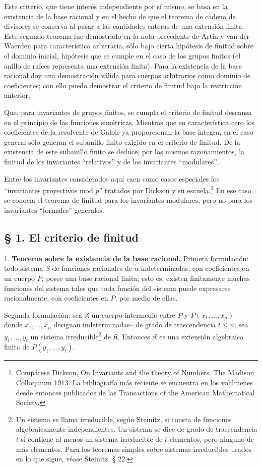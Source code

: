 \documentclass[11pt]{article}
\begin{document}
Este criterio, que tiene interés independiente por sí mismo, se basa en la existencia de la base racional y en el hecho de que el teorema de cadena de divisores se conserva al pasar a las cantidades enteras de una extensión finita. Este segundo teorema fue demostrado en la nota precedente de Artin y van der Waerden para característica arbitraria, sólo bajo cierta hipótesis de finitud sobre el dominio inicial, hipótesis que se cumple en el caso de los grupos finitos (el anillo de raíces representa una extensión finita). Para la existencia de la base racional doy una demostración válida para cuerpos arbitrarios como dominio de coeficientes; con ello puedo demostrar el criterio de finitud bajo la restricción anterior.

Que, para invariantes de grupos finitos, se cumpla el criterio de finitud descansa en el principio de las funciones simétricas. Mientras que en característica cero los coeficientes de la resolvente de Galois ya proporcionan la base íntegra, en el caso general sólo generan el subanillo finito exigido en el criterio de finitud. De la existencia de este subanillo finito se deduce, por los mismos razonamientos, la finitud de los invariantes ``relativos'' y de los invariantes ``modulares''.

Entre los invariantes considerados aquí caen como casos especiales los ``invariantes proyectivos mod $p$'' tratados por Dickson y su escuela.\footnote{Compárese Dickson, On Invariants and the theory of Numbers. The Madison Colloquium 1913. La bibliografía más reciente se encuentra en los volúmenes desde entonces publicados de las Transactions of the American Mathematical Society.} En ese caso se conocía el teorema de finitud para los invariantes modulares, pero no para los invariantes ``formales'' generales.

\subsection*{§ 1. El criterio de finitud}

1. \textbf{Teorema sobre la existencia de la base racional.} Primera formulación: todo sistema $S$ de funciones racionales de $n$ indeterminadas, con coeficientes en un cuerpo $P$, posee una base racional finita; esto es, existen finitamente muchas funciones del sistema tales que toda función del sistema puede expresarse racionalmente, con coeficientes en $P$, por medio de ellas.

Segunda formulación: sea $\mathfrak K$ un cuerpo intermedio entre $P$ y $P(x_1,\ldots,x_n)$ --donde $x_1,\ldots,x_n$ designan indeterminadas-- de grado de trascendencia $t\leq n$; sea $y_1,\ldots,y_t$ un sistema irreducible\footnote{Un sistema se llama irreducible, según Steinitz, si consta de funciones algebraicamente independientes. Un sistema se dice de grado de trascendencia $t$ si contiene al menos un sistema irreducible de $t$ elementos, pero ninguno de más elementos. Para los teoremas simples sobre sistemas irreducibles usados en lo que sigue, véase Steinitz, § 22.} de $\mathfrak K$. Entonces $\mathfrak K$ es una extensión algebraica finita de $P(y_1,\ldots,y_t)$.
\end{document}
